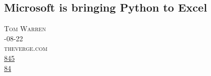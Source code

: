 \documentclass[10pt,a4paper]{article}
\begin{document}
\subsection{Microsoft is bringing Python to Excel}
\noindent\begin{minipage}[t]{0.20\linewidth}
\vspace{0pt}
\noindent\textsc{\footnotesize
{\scriptsize\faUser}\space 
Tom Warren \\
{\scriptsize\faCalendar}-08-22 \\
{\scriptsize\faGlobe}\space 
theverge.com \\
{\scriptsize\faThumbsOUp}\space 
\href{http://news.ycombinator.com/item?id=37222191\&utm\_term=comment}{845} \\
{\scriptsize\faComments}\space 
\href{http://news.ycombinator.com/item?id=37222191\&utm\_term=comment}{84} \\
}
\end{minipage} 
\end{document}
